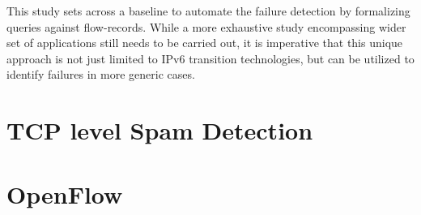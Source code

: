 This study sets across a baseline to automate the failure detection by formalizing queries against flow-records. While a more exhaustive study encompassing wider set of applications still needs to be carried out, it is imperative that this unique approach is not just limited to IPv$6$ transition technologies, but can be utilized to identify failures in more generic cases.

\section{TCP level Spam Detection}\label{sec:spam-detection}
\section{OpenFlow}\label{sec:openflow}